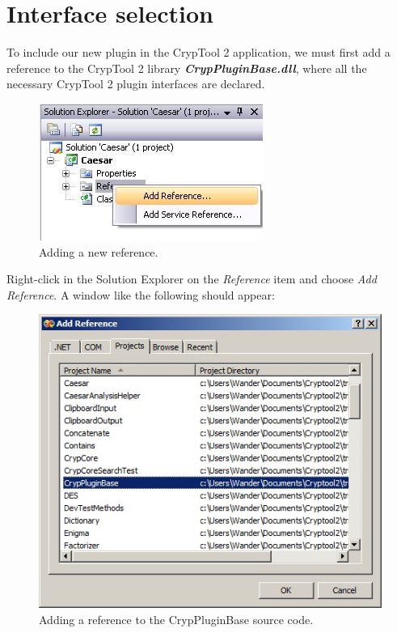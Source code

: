 \section{Interface selection}
\label{sec:InterfaceSelection}

To include our new plugin in the CrypTool 2 application, we must first add a reference to the CrypTool 2 library \textbf{\textit{CrypPluginBase.dll}}, where all the necessary CrypTool 2 plugin interfaces are declared.

\begin{figure}[h!]
	\includegraphics{figures/add_reference.jpg}
	\caption{Adding a new reference.}
	\label{fig:add_reference}
\end{figure}

\noindent Right-click in the Solution Explorer on the \textit{Reference} item and choose \textit{Add Reference}. A window like the following should appear:

\begin{figure}[h!]
	\centering
		\includegraphics{figures/add_pluginbase_source.jpg}
	\caption{Adding a reference to the CrypPluginBase source code.}
	\label{fig:add_pluginbase_source}
\end{figure}
\clearpage

